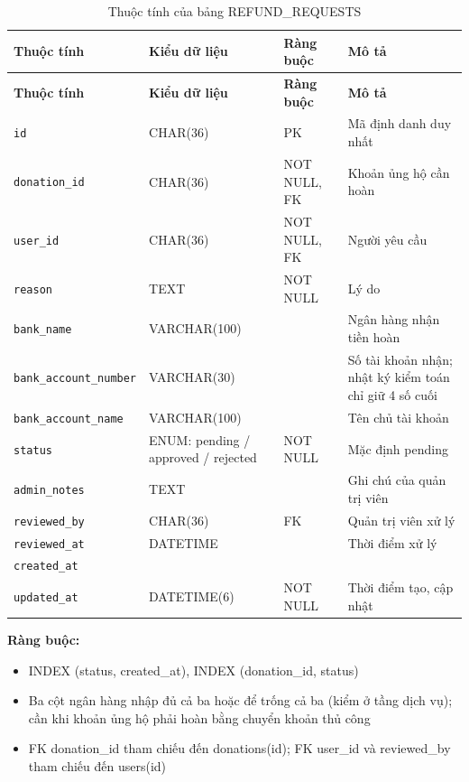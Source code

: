 {\small
\begin{longtable}{|P{3.2cm}|P{2.8cm}|P{2.2cm}|p{5.4cm}|}
    \caption{Thuộc tính của bảng REFUND\_\allowbreak{}REQUESTS}
    \label{tab:refund_requests} \\
    \hline
    \textbf{Thuộc tính} & \textbf{Kiểu dữ liệu} & \textbf{Ràng buộc} & \textbf{Mô tả} \\
    \hline
    \endfirsthead
    \hline
    \textbf{Thuộc tính} & \textbf{Kiểu dữ liệu} & \textbf{Ràng buộc} & \textbf{Mô tả} \\
    \hline
    \endhead

    \texttt{id} & CHAR(36) & PK & Mã định danh duy nhất \\
    \hline
    \texttt{donation\_\allowbreak{}id} & CHAR(36) & NOT NULL, FK & Khoản ủng hộ cần hoàn \\
    \hline
    \texttt{user\_\allowbreak{}id} & CHAR(36) & NOT NULL, FK & Người yêu cầu \\
    \hline
    \texttt{reason} & TEXT & NOT NULL & Lý do \\
    \hline
    \texttt{bank\_\allowbreak{}name} & VARCHAR(100) &  & Ngân hàng nhận tiền hoàn \\
    \hline
    \texttt{bank\_\allowbreak{}account\_\allowbreak{}number} & VARCHAR(30) &  & Số tài khoản nhận; nhật ký kiểm toán chỉ giữ 4 số cuối \\
    \hline
    \texttt{bank\_\allowbreak{}account\_\allowbreak{}name} & VARCHAR(100) &  & Tên chủ tài khoản \\
    \hline
    \texttt{status} & ENUM: pending / approved / rejected & NOT NULL & Mặc định pending \\
    \hline
    \texttt{admin\_\allowbreak{}notes} & TEXT &  & Ghi chú của quản trị viên \\
    \hline
    \texttt{reviewed\_\allowbreak{}by} & CHAR(36) & FK & Quản trị viên xử lý \\
    \hline
    \texttt{reviewed\_\allowbreak{}at} & DATETIME &  & Thời điểm xử lý \\
    \hline
    \texttt{created\_\allowbreak{}at} &  &  &  \\
    \hline
    \texttt{updated\_\allowbreak{}at} & DATETIME(6) & NOT NULL & Thời điểm tạo, cập nhật \\
    \hline
\end{longtable}
}

\textbf{Ràng buộc:}
\begin{itemize}
    \item INDEX (status, created\_\allowbreak{}at), INDEX (donation\_\allowbreak{}id, status)
    \item Ba cột ngân hàng nhập đủ cả ba hoặc để trống cả ba (kiểm ở tầng dịch vụ); cần khi khoản ủng hộ phải hoàn bằng chuyển khoản thủ công
    \item FK donation\_\allowbreak{}id tham chiếu đến donations(id); FK user\_\allowbreak{}id và reviewed\_\allowbreak{}by tham chiếu đến users(id)
\end{itemize}

